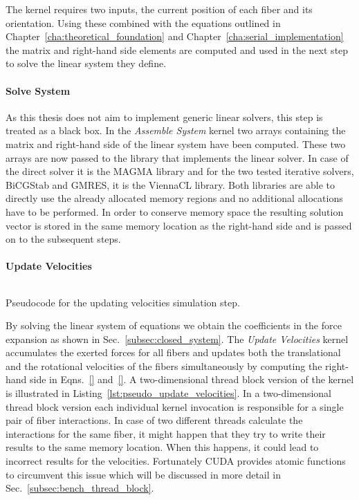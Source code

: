 The kernel requires two inputs, the current position of each fiber and its orientation. Using these combined with the equations outlined in Chapter~\ref{cha:theoretical_foundation} and Chapter~\ref{cha:serial_implementation} the matrix and right-hand side elements are computed and used in the next step to solve the linear system they define.

\paragraph{Solve System}
As this thesis does not aim to implement generic linear solvers, this step is treated as a black box. In the \emph{Assemble System} kernel two arrays containing the matrix and right-hand side of the linear system have been computed. These two arrays are now passed to the library that implements the linear solver. In case of the direct solver it is the MAGMA library and for the two tested iterative solvers, BiCGStab and GMRES, it is the ViennaCL library. Both libraries are able to directly use the already allocated memory regions and no additional allocations have to be performed. In order to conserve memory space the resulting solution vector is stored in the same memory location as the right-hand side and is passed on to the subsequent steps.

\paragraph{Update Velocities}

\begin{listing}[!htbp]
  \centering
  \inputminted[mathescape,
    linenos,
    numbersep=5pt,
    fontsize=\footnotesize,
    frame=lines,
    framesep=2mm]{c}{lst/update_velocities.lst}
  \caption{Pseudocode for the updating velocities simulation step.}
  \label{lst:pseudo_update_velocities}
\end{listing}

By solving the linear system of equations we obtain the coefficients in the force expansion as shown in Sec.~\ref{subsec:closed_system}. The \emph{Update Velocities} kernel accumulates the exerted forces for all fibers and updates both the translational and the rotational velocities of the fibers simultaneously by computing the right-hand side in Eqns.~\eqref{} and~\eqref{}. A two-dimensional thread block version of the kernel is illustrated in Listing~\ref{lst:pseudo_update_velocities}. In a two-dimensional thread block version each individual kernel invocation is responsible for a single pair of fiber interactions. In case of two different threads calculate the interactions for the same fiber, it might happen that they try to write their results to the same memory location. When this happens, it could lead to incorrect results for the velocities. Fortunately CUDA provides atomic functions to circumvent this issue which will be discussed in more detail in Sec.~\ref{subsec:bench_thread_block}. 

